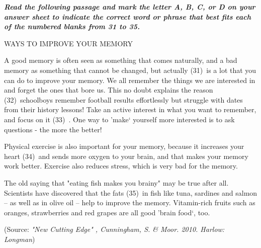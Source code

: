 \documentclass[11pt]{article}
\def\ktrang{\makebox[1.5cm]{\hrulefill}\ }
\begin{document}
\begin{multiplechoice}[rearrange=yes, keycolumns=2]%
\examvspace*{0.7cm}
\textit{\textbf{Read the following passage and mark the letter A, B, C, or D on your answer sheet to indicate the
correct word or phrase that best fits each of the numbered blanks from 31 to 35.}}
\begin{center}
WAYS TO IMPROVE YOUR MEMORY
\end{center}
A good memory is often seen as something that comes naturally, and a bad memory as something that
cannot be changed, but actually (31)\ktrang  is a lot that you can do to improve your memory.
We all remember the things we are interested in and forget the ones that bore us. This no doubt explains
the reason (32)\ktrang  schoolboys remember football results effortlessly but struggle with dates from their
history lessons! Take an active interest in what you want to remember, and focus on it (33)\ktrang . One way
to 'make‘ yourself more interested is to ask questions - the more the better!

Physical exercise is also important for your memory, because it increases your heart (34)\ktrang  and sends
more oxygen to your brain, and that makes your memory work better. Exercise also reduces stress, which is
very bad for the memory.

The old saying that "eating fish makes you brainy" may be true after all. Scientists have discovered that the
fats (35)\ktrang in fish like tuna, sardines and salmon -- as well as in olive oil -- help to improve the memory.
Vitamin-rich fruits such as oranges, strawberries and red grapes are all good 'brain food‘, too.

\hfill(Source: \textit{"New Cutting Edge" ,  Cunningham, S. \& Moor. 2010. Harlow: Longman}) 

\begin{question} %
\datcot
\bonpat
{}
{}
{}
{}
\end{question}

\begin{question} %
\datcot
\bonpat
{}
{}
{}
{}
\end{question}

\begin{question} %
\datcot
\bonpat
{}
{}
{}
{}
\end{question}

\begin{question} %
\datcot
\bonpat
{}
{}
{}
{}
\end{question}

\begin{question} %
\datcot
\bonpat
{}
{}
{}
{}
\end{question}
\end{multiplechoice}
\end{document}
